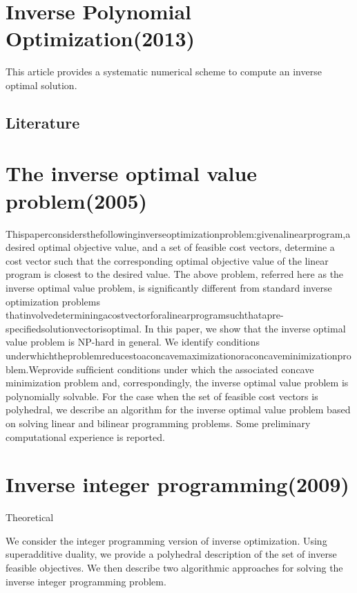 \documentclass[UTF8]{article}
\begin{document}
\section{Inverse Polynomial Optimization(2013)}


This article provides a systematic numerical scheme to compute an inverse optimal solution.

\subsection{Literature}




\section{The inverse optimal value problem(2005)}

Thispaperconsidersthefollowinginverseoptimizationproblem:givenalinearprogram,adesired optimal objective value, and a set of feasible cost vectors, determine a cost vector such that the corresponding optimal objective value of the linear program is closest to the desired value.
The above problem, referred here as the inverse optimal value problem, is signiﬁcantly different from standard inverse optimization problems thatinvolvedeterminingacostvectorforalinearprogramsuchthatapre-speciﬁedsolutionvectorisoptimal. In this paper, we show that the inverse optimal value problem is NP-hard in general. We identify conditions underwhichtheproblemreducestoaconcavemaximizationoraconcaveminimizationproblem.Weprovide sufﬁcient conditions under which the associated concave minimization problem and, correspondingly, the inverse optimal value problem is polynomially solvable. For the case when the set of feasible cost vectors is polyhedral, we describe an algorithm for the inverse optimal value problem based on solving linear and bilinear programming problems. Some preliminary computational experience is reported.


\section{Inverse integer programming(2009)}

Theoretical

We consider the integer programming version of inverse optimization. Using superadditive duality, we provide a polyhedral description of the set of inverse feasible objectives. We then describe two algorithmic approaches for solving the inverse integer programming problem.
\end{document}
